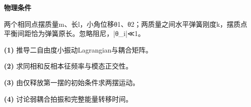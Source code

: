 \textbf{物理条件}\par 两个相同点摆质量m、长l，小角位移θ1、θ2；两质量之间水平弹簧刚度k，摆质点平衡间距恰为弹簧原长。忽略阻尼，|θ\_i|≪1。
\par\noindent\textbf{(1)} 推导二自由度小振动Lagrangian与耦合矩阵。
\par\noindent\textbf{(2)} 求同相和反相本征频率与模态正交性。
\par\noindent\textbf{(3)} 由仅释放第一摆的初始条件求两摆运动。
\par\noindent\textbf{(4)} 讨论弱耦合拍振和完整能量转移时间。
